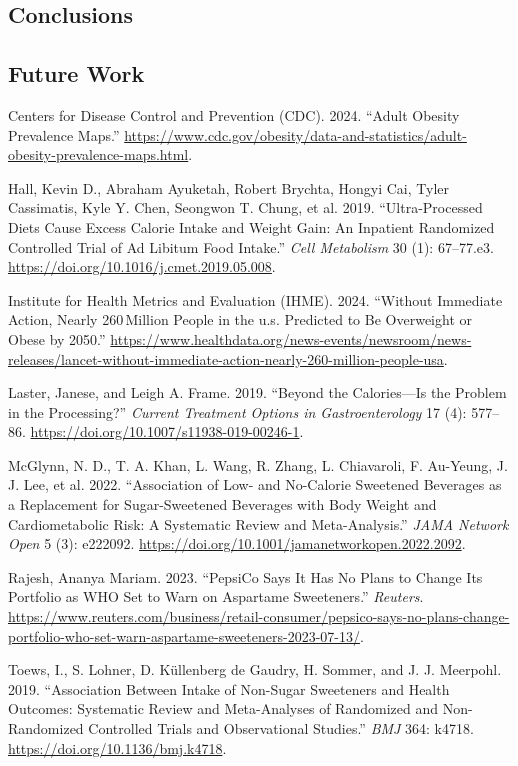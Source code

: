 \documentclass[
  11pt,
]{article}
\newlength{\cslhangindent}
\newenvironment{CSLReferences}[2] %
 {\begin{list}{}{%
  \setlength{\itemindent}{0pt}
  \setlength{\leftmargin}{0pt}
  \setlength{\parsep}{0pt}
  \ifodd #1
   \setlength{\leftmargin}{\cslhangindent}
   \setlength{\itemindent}{-1\cslhangindent}
  \fi
  \setlength{\itemsep}{#2\baselineskip}}}
 {\end{list}}
\begin{document}
\subsection{Conclusions}\label{conclusions}

\subsection*{Future Work}\label{future-work}

\label{refs}
\begin{CSLReferences}{1}{0}
Centers for Disease Control and Prevention (CDC). 2024. {``Adult Obesity
Prevalence Maps.''}
\url{https://www.cdc.gov/obesity/data-and-statistics/adult-obesity-prevalence-maps.html}.

Hall, Kevin D., Abraham Ayuketah, Robert Brychta, Hongyi Cai, Tyler
Cassimatis, Kyle Y. Chen, Seongwon T. Chung, et al. 2019.
{``Ultra-Processed Diets Cause Excess Calorie Intake and Weight Gain: An
Inpatient Randomized Controlled Trial of Ad Libitum Food Intake.''}
\emph{Cell Metabolism} 30 (1): 67--77.e3.
\url{https://doi.org/10.1016/j.cmet.2019.05.008}.

Institute for Health Metrics and Evaluation (IHME). 2024. {``Without
Immediate Action, Nearly 260\,Million People in the u.s. Predicted to Be
Overweight or Obese by 2050.''}
\url{https://www.healthdata.org/news-events/newsroom/news-releases/lancet-without-immediate-action-nearly-260-million-people-usa}.

Laster, Janese, and Leigh A. Frame. 2019. {``Beyond the Calories---Is
the Problem in the Processing?''} \emph{Current Treatment Options in
Gastroenterology} 17 (4): 577--86.
\url{https://doi.org/10.1007/s11938-019-00246-1}.

McGlynn, N. D., T. A. Khan, L. Wang, R. Zhang, L. Chiavaroli, F.
Au-Yeung, J. J. Lee, et al. 2022. {``Association of Low- and No-Calorie
Sweetened Beverages as a Replacement for Sugar-Sweetened Beverages with
Body Weight and Cardiometabolic Risk: A Systematic Review and
Meta-Analysis.''} \emph{JAMA Network Open} 5 (3): e222092.
\url{https://doi.org/10.1001/jamanetworkopen.2022.2092}.

Rajesh, Ananya Mariam. 2023. {``PepsiCo Says It Has No Plans to Change
Its Portfolio as WHO Set to Warn on Aspartame Sweeteners.''}
\emph{Reuters}.
\url{https://www.reuters.com/business/retail-consumer/pepsico-says-no-plans-change-portfolio-who-set-warn-aspartame-sweeteners-2023-07-13/}.

Toews, I., S. Lohner, D. Küllenberg de Gaudry, H. Sommer, and J. J.
Meerpohl. 2019. {``Association Between Intake of Non-Sugar Sweeteners
and Health Outcomes: Systematic Review and Meta-Analyses of Randomized
and Non-Randomized Controlled Trials and Observational Studies.''}
\emph{BMJ} 364: k4718. \url{https://doi.org/10.1136/bmj.k4718}.

\end{CSLReferences}
\end{document}
